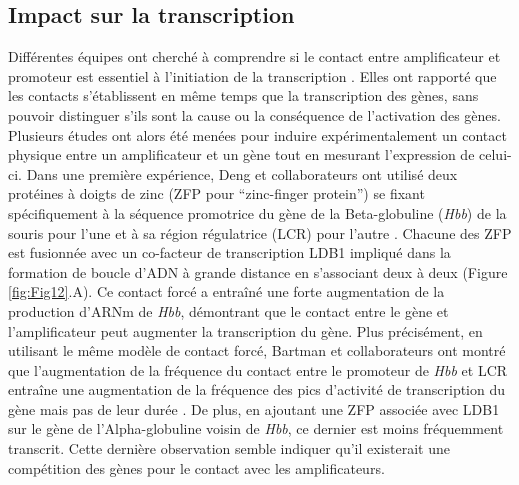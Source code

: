 \subsection{Impact sur la transcription}
\label{subsec:impact-transcription}

Différentes équipes ont cherché à comprendre si le contact entre \gls{amplificateur} et promoteur est essentiel à l’initiation de la transcription \citep{carter_long-range_2002}. Elles ont rapporté que les contacts s'établissent en même temps que la transcription des gènes, sans pouvoir distinguer s’ils sont la cause ou la conséquence de l'activation des gènes. Plusieurs études ont alors été menées pour induire expérimentalement un contact physique entre un \gls{amplificateur} et un gène tout en mesurant l’expression de celui-ci. Dans une première expérience, Deng et collaborateurs ont utilisé deux protéines à doigts de zinc (ZFP pour “zinc-finger protein”) se fixant spécifiquement à la séquence promotrice du gène de la Beta-globuline (\textit{Hbb}) de la souris pour l’une et à sa région régulatrice (LCR) pour l’autre \citep{deng_controlling_2012}. Chacune des ZFP est fusionnée avec un co-facteur de transcription LDB1 impliqué dans la formation de boucle d’ADN à grande distance en s’associant deux à deux (Figure \ref{fig:Fig12}.A). Ce contact forcé a entraîné une forte augmentation de la production d’\acrshort{ARNm} de \textit{Hbb}, démontrant que le contact entre le gène et l’\gls{amplificateur} peut augmenter la transcription du gène. Plus précisément, en utilisant le même modèle de contact forcé, Bartman et collaborateurs ont montré que l’augmentation de la fréquence du contact entre le promoteur de \textit{Hbb} et LCR entraîne une augmentation de la fréquence des pics d’activité de transcription du gène mais pas de leur durée \citep{bartman_enhancer_2016}. De plus, en ajoutant une ZFP associée avec LDB1 sur le gène de l’Alpha-globuline voisin de \textit{Hbb}, ce dernier est moins fréquemment transcrit. Cette dernière observation semble indiquer qu’il existerait une compétition des gènes pour le contact avec les \glspl{amplificateur}.


